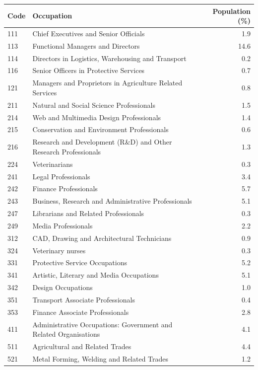 \documentclass[aps,pre,floats,floatfix,superscriptaddress,twocolumn,final,10pt]{revtex4-2}
\theoremstyle{definition}
\begin{document}
\begin{table}
    \centering
    \begin{tabular}{llr}
    \toprule
    Code & Occupation & Population (\%) \\
    \midrule
    111 & Chief Executives and Senior Officials & 1.9 \\
    113 & Functional Managers and Directors & 14.6 \\
    114 & Directors in Logistics, Warehousing and Transport & 0.2 \\
    116 & Senior Officers in Protective Services & 0.7 \\
    121 & Managers and Proprietors in Agriculture Related Services & 0.8 \\
    211 & Natural and Social Science Professionals & 1.5 \\
    214 & Web and Multimedia Design Professionals & 1.4 \\
    215 & Conservation and Environment Professionals & 0.6 \\
    216 & Research and Development (R\&D) and Other Research Professionals & 1.3 \\
    224 & Veterinarians & 0.3 \\
    241 & Legal Professionals & 3.4 \\
    242 & Finance Professionals & 5.7 \\
    243 & Business, Research and Administrative Professionals & 5.1 \\
    247 & Librarians and Related Professionals & 0.3 \\
    249 & Media Professionals & 2.2 \\
    312 & CAD, Drawing and Architectural Technicians & 0.9 \\
    324 & Veterinary nurses & 0.3 \\
    331 & Protective Service Occupations & 5.2 \\
    341 & Artistic, Literary and Media Occupations & 5.1 \\
    342 & Design Occupations & 1.0 \\
    351 & Transport Associate Professionals & 0.4 \\
    353 & Finance Associate Professionals & 2.8 \\
    411 & Administrative Occupations: Government and Related Organisations & 4.1 \\
    511 & Agricultural and Related Trades & 4.4 \\
    521 & Metal Forming, Welding and Related Trades & 1.2 \\

\end{tabular}
\end{table}
\end{document}
